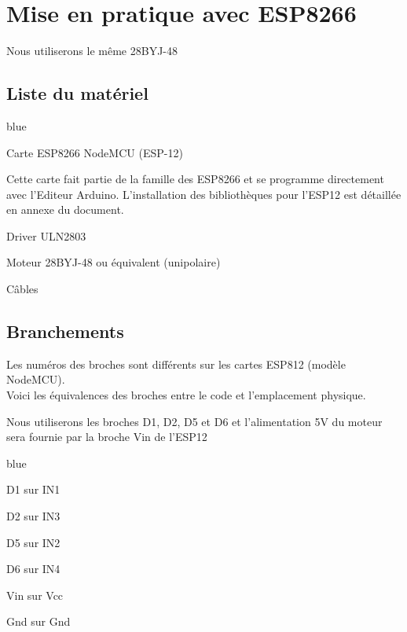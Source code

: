 \section{Mise en pratique avec ESP8266} 

Nous utiliserons le même \pap 28BYJ-48

\subsection{Liste du matériel}

\begin{items}{blue}{\Bullet}
  \item Carte ESP8266 NodeMCU (ESP-12)


  Cette carte fait partie de la famille des ESP8266 et se programme directement avec l'Editeur Arduino. L'installation des bibliothèques pour l'ESP12 est détaillée en annexe du document.
  \item Driver ULN2803
  \item Moteur \pap 28BYJ-48 ou équivalent (\pap unipolaire)
  \item Câbles
\end{items}


\subsection{Branchements}

Les numéros des broches sont différents sur les cartes ESP812 (modèle NodeMCU).\\
Voici les équivalences des broches entre le code et l'emplacement physique.


Nous utiliserons les broches D1, D2, D5 et D6 et  l'alimentation 5V du moteur sera fournie par la broche Vin de l'ESP12

\begin{items}{blue}{\Bullet}
  \item D1 sur IN1
  \item D2 sur IN3
  \item D5 sur IN2
  \item D6 sur IN4
  \item Vin sur Vcc
  \item Gnd sur Gnd
\end{items}


